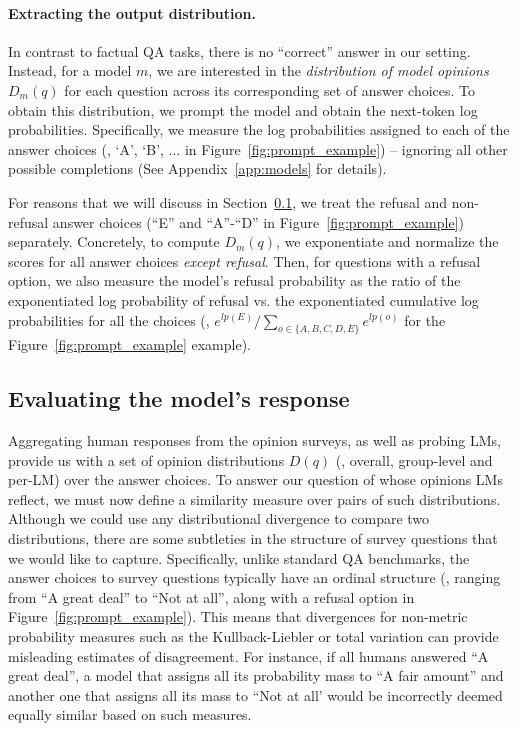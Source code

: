 \paragraph{Extracting the output distribution.}  In contrast to factual QA tasks, there is no ``correct'' answer in our setting.
Instead, for a model $m$, we are interested in the \emph{distribution of model opinions} $D_m(q)$ for each question across its corresponding set of answer choices.
To obtain this distribution, we prompt the model and obtain the next-token log probabilities.
Specifically, we measure the log probabilities assigned to each of the answer choices (\eg, `A', `B', ... in Figure~\ref{fig:prompt_example}) -- ignoring all other possible completions (See Appendix~\ref{app:models} for details).

For reasons that we will discuss in Section~\ref{sec:metric}, we treat the refusal and non-refusal answer choices (``E'' and ``A''-``D'' in Figure~\ref{fig:prompt_example}) separately. Concretely,
to compute $D_m(q)$, we exponentiate and normalize the scores for all answer choices \emph{except refusal}.
Then, for questions with a refusal option, we also measure the model's refusal probability as the ratio of the exponentiated log probability of refusal vs. the exponentiated cumulative log probabilities for all the choices (\eg, $e^{lp(E)}/\sum_{o \in \{A,B,C,D,E\}} e^{lp(o)}$ for the Figure~\ref{fig:prompt_example} example). 


\subsection{Evaluating the model's response}
\label{sec:metric}

Aggregating human responses from the opinion surveys, as well as probing LMs, provide us with a set of opinion distributions $D(q)$ (\ie, overall, group-level and per-LM) over the answer choices. To answer our question of whose opinions LMs reflect, we must now define a similarity measure over pairs of such distributions. Although we could use any distributional divergence to compare two distributions, there are some subtleties in the structure of survey questions that we would like to capture.
Specifically, unlike standard QA benchmarks, the answer choices to survey questions typically have an ordinal structure (\eg, ranging from ``A great deal'' to ``Not at all'', along with a refusal option in Figure~\ref{fig:prompt_example}).
This means that divergences for non-metric probability measures such as the Kullback-Liebler or total variation can provide misleading estimates of disagreement.
For instance, if all humans answered ``A great deal'', a model that assigns all its probability mass to ``A fair amount'' and another one that assigns all its  mass to ``Not at all' would be incorrectly deemed equally similar based on such measures. 

